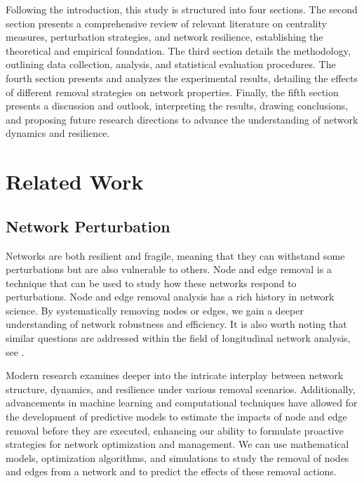 \documentclass[conference]{IEEEtran} %
\begin{document}
Following the introduction, this study is structured into four sections. The second section presents a comprehensive review of relevant literature on centrality measures, perturbation strategies, and network resilience, establishing the theoretical and empirical foundation. The third section details the methodology, outlining data collection, analysis, and statistical evaluation procedures. The fourth section presents and analyzes the experimental results, detailing the effects of different removal strategies on network properties. Finally, the fifth section presents a discussion and outlook, interpreting the results, drawing conclusions, and proposing future research directions to advance the understanding of network dynamics and resilience.

\section{Related Work}

\subsection{Network Perturbation}

Networks are both resilient and fragile, meaning that they can withstand some perturbations but are also vulnerable to others. Node and edge removal is a technique that can be used to study how these networks respond to perturbations. Node and edge removal analysis has a rich history in network science. By systematically removing nodes or edges, we gain a deeper understanding of network robustness and efficiency. It is also worth noting that similar questions are addressed within the field of longitudinal network analysis, see \cite{dorpinghaus2023towards}. 

Modern research examines deeper into the intricate interplay between network structure, dynamics, and resilience under various removal scenarios. Additionally, advancements in machine learning and computational techniques have allowed for the development of predictive models to estimate the impacts of node and edge removal before they are executed, enhancing our ability to formulate proactive strategies for network optimization and management. We can use mathematical models, optimization algorithms, and simulations to study the removal of nodes and edges from a network and to predict the effects of these removal actions.
\end{document}
